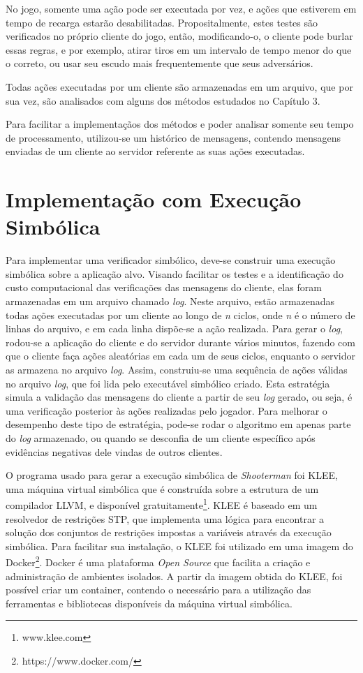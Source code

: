No jogo, somente uma ação pode ser executada por vez, e ações que estiverem em tempo de recarga estarão desabilitadas. Propositalmente, estes testes são verificados no próprio cliente do jogo, então, modificando-o, o cliente pode burlar essas regras, e por exemplo, atirar tiros em um intervalo de tempo menor do que o correto, ou usar seu escudo mais frequentemente que seus adversários.

Todas ações executadas por um cliente são armazenadas em um arquivo, que por sua vez, são analisados com alguns dos métodos estudados no Capítulo 3.


Para facilitar a implementaçãos dos métodos e poder analisar somente seu tempo de processamento, utilizou-se um histórico de mensagens, contendo mensagens enviadas de um cliente ao servidor referente as suas ações executadas. 

\section{Implementação com Execução Simbólica}

\label{implementsimbolic}

Para implementar uma verificador simbólico, deve-se construir uma execução simbólica sobre a aplicação alvo. Visando facilitar os testes e a identificação do custo computacional das verificações das mensagens do cliente, elas foram armazenadas em um arquivo chamado \textit{log}. Neste arquivo, estão armazenadas todas ações executadas por um cliente ao longo de \textit{n} ciclos, onde \textit{n} é o número de linhas do arquivo, e em cada linha dispõe-se a ação realizada. Para gerar o \textit{log}, rodou-se a aplicação do cliente e do servidor durante vários minutos, fazendo com que o cliente faça ações aleatórias em cada um de seus ciclos, enquanto o servidor as armazena no arquivo \textit{log}. Assim, construiu-se uma sequência de ações válidas no arquivo \textit{log}, que foi lida pelo executável simbólico criado. Esta estratégia simula a validação das mensagens do cliente a partir de seu \textit{log} gerado, ou seja, é uma verificação posterior às ações realizadas pelo jogador. Para melhorar o desempenho deste tipo de estratégia, pode-se rodar o algoritmo em apenas parte do \textit{log} armazenado, ou quando se desconfia de um cliente específico após evidências negativas dele vindas de outros clientes. 


O programa usado para gerar a execução simbólica de \textit{Shooterman} foi KLEE, uma máquina virtual simbólica que é construída sobre a estrutura de um compilador LLVM, e disponível gratuitamente\footnote{www.klee.com}. KLEE é baseado em um resolvedor de restrições STP, que implementa uma lógica para encontrar a solução dos conjuntos de restrições impostas a variáveis através da execução simbólica. Para facilitar sua instalação, o KLEE foi utilizado em uma imagem do Docker\footnote{https://www.docker.com/}. Docker é uma plataforma \textit{Open Source} que facilita a criação e administração de ambientes isolados. A partir da imagem obtida do KLEE, foi possível criar um container, contendo o necessário para a utilização das ferramentas e bibliotecas disponíveis da máquina virtual simbólica.  


